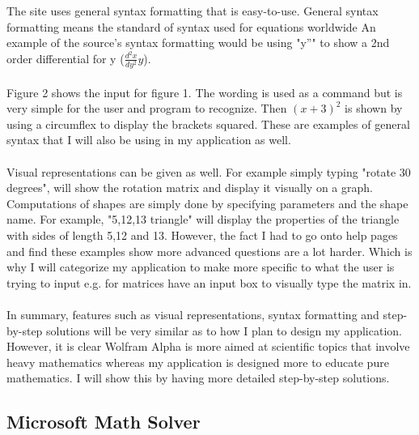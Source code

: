 \documentclass[final]{cmpreport}
\begin{document}
	The site uses general syntax formatting that is easy-to-use. General syntax formatting means the standard of syntax used for equations worldwide An example of the source's syntax formatting would be using "y''" to show a 2nd order differential for y ($\frac{d^2x}{dy^2} y$). \\
	\\Figure 2 shows the input for figure 1. The wording is used as a command but is very simple for the user and program to recognize. Then $(x+3)^2$ is shown by using a circumflex to display the brackets squared. These are examples of general syntax that I will also be using in my application as well.\\
	\\Visual representations can be given as well. For example simply typing "rotate 30 degrees", will show the rotation matrix and display it visually on a graph.
	Computations of shapes are simply done by specifying parameters and the shape name. For example, "5,12,13 triangle" will display the properties of the triangle with sides of length 5,12 and 13.
	However, the fact I had to go onto help pages and find these examples show more advanced questions are a lot harder. Which is why I will categorize my application to make more specific to what the user is trying to input e.g. for matrices have an input box to visually type the matrix in.\\
	\\In summary, features such as visual representations, syntax formatting and step-by-step solutions will be very similar as to how I plan to design my application. However, it is clear Wolfram Alpha is more aimed at scientific topics that involve heavy mathematics whereas my application is designed more to educate pure mathematics. I will show this by having more detailed step-by-step solutions.\\
	
	\subsection{Microsoft Math Solver}
	
\end{document}
